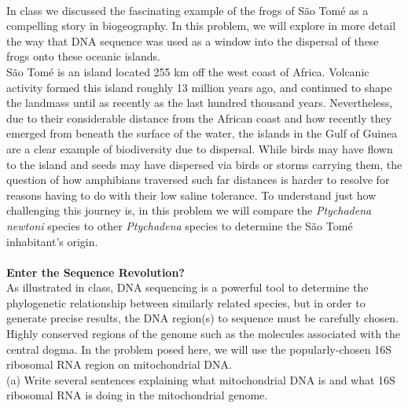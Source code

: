 \documentclass[12pt]{article}    %
\begin{document}
\\


In class we discussed the fascinating example of the frogs of S\~ao Tom\'e as a
compelling story in biogeography.  In this problem, we will explore in more
detail the way that DNA sequence was used as a window into the dispersal of
these frogs onto these oceanic islands.\\

S\~ao Tom\'e is an island located 255 km off the west coast of Africa. Volcanic
activity formed this island roughly 13 million years ago, and continued to shape
the landmass until as  recently as the last hundred thousand years.
Nevertheless, due to their considerable distance from the African coast and how
recently they emerged from beneath the surface of the water, the islands in the
Gulf of Guinea are  a clear example of biodiversity due to dispersal. While
birds may have flown to the island and seeds may have dispersed via birds or
storms carrying them, the question of how amphibians traversed such far
distances is harder to resolve for reasons having to do with their low saline
tolerance. To understand just how challenging this journey is, in this problem
we will compare the \emph{Ptychadena newtoni} species to other \emph{Ptychadena}
species to determine  the S\~ao Tom\'e inhabitant's origin.\\
\\
\newline
\textbf{Enter the Sequence Revolution?}\\

As illustrated in class, DNA sequencing is a powerful tool to determine the
phylogenetic relationship between similarly related species, but in order to
generate precise results,  the DNA region(s) to sequence must be carefully
chosen. Highly conserved regions of the genome such as the molecules associated
with the central dogma. In the problem posed here, we will use the
popularly-chosen 16S ribosomal RNA region on mitochondrial DNA. \\

(a) Write several sentences explaining what mitochondrial DNA is and
what 16S ribosomal RNA is doing in the mitochondrial genome.\\
\end{document}
